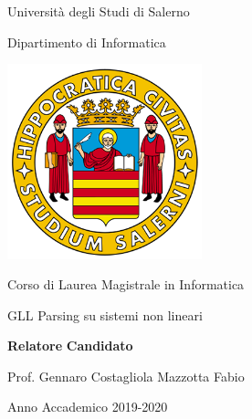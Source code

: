 %
\begin{titlepage}
\begin{center}
	{\LARGE Università degli Studi di Salerno}\par
	\vspace{0.5cm}
	{\Large Dipartimento di Informatica}\par
	\vspace{1cm}
	\includegraphics[height=160pt]{logounisa.png}\par
	\vspace{1cm}
	{\Large Corso di Laurea Magistrale in Informatica}\par
	\vspace{2cm}
	{\Huge GLL Parsing su sistemi non lineari}\par
	\vspace{2cm}
\end{center}
\begin{flushleft}
	{\large\textbf{Relatore}}
	\hspace{8cm}
	{\large\textbf{Candidato}}\par
	\vspace{0.1cm}
	{\large Prof. Gennaro Costagliola}
	\hspace{4.5cm}
	{\large Mazzotta Fabio}
\end{flushleft}	
	\vspace{3.5cm}
\begin{center}
	{\large Anno Accademico 2019-2020}
\end{center}
\end{titlepage}
%
